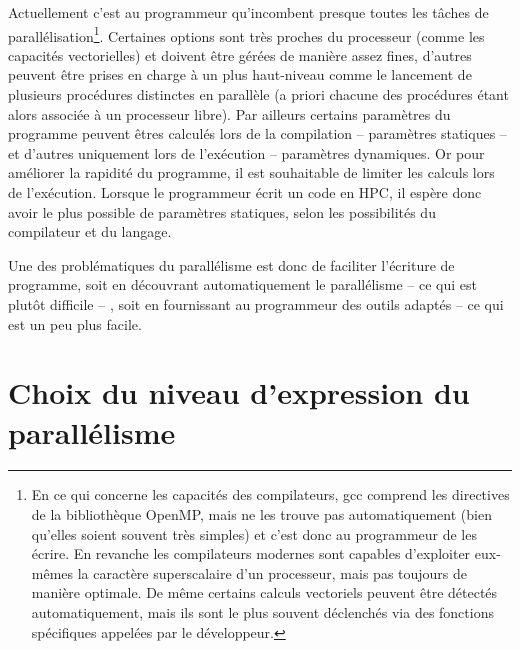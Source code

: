 Actuellement c'est au programmeur qu'incombent presque toutes les tâches de parallélisation\footnote{En ce qui concerne les capacités des compilateurs, \textsf{gcc} comprend les directives de la bibliothèque \textsf{OpenMP}, mais ne les trouve pas automatiquement (bien qu'elles soient souvent très simples) et c'est donc au programmeur de les écrire. En revanche les compilateurs modernes sont capables d'exploiter eux-mêmes la caractère superscalaire d'un processeur, mais pas toujours de manière optimale. De même certains calculs vectoriels peuvent être détectés automatiquement, mais ils sont le plus souvent déclenchés via des fonctions spécifiques appelées par le développeur.}. %
Certaines options sont très proches du processeur (comme les capacités vectorielles) et doivent être gérées de manière assez fines, d'autres peuvent être prises en charge à un plus haut-niveau comme le lancement de plusieurs procédures distinctes en parallèle (a priori chacune des procédures étant alors associée à un processeur libre). %
Par ailleurs certains paramètres du programme peuvent êtres calculés lors de la compilation -- paramètres statiques -- et d'autres uniquement lors de l'exécution -- paramètres dynamiques. Or pour améliorer la rapidité du programme, il est souhaitable de limiter les calculs lors de l'exécution. Lorsque le programmeur écrit un code en HPC, il espère donc avoir le plus possible de paramètres statiques, selon les possibilités du compilateur et du langage. 

Une des problématiques du parallélisme est donc de faciliter l'écriture de programme, soit en découvrant automatiquement le parallélisme -- ce qui est plutôt difficile -- , soit en fournissant au programmeur des outils adaptés -- ce qui est un peu plus facile.

\section{Choix du niveau d'expression du parallélisme}


